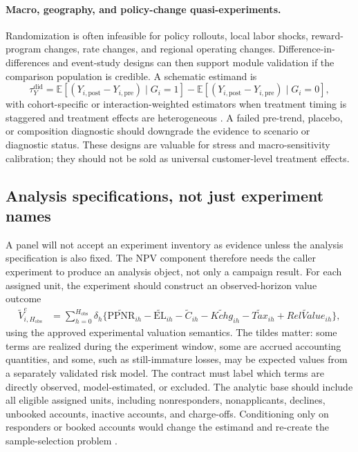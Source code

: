 \documentclass[11pt]{article}
\newcommand{\E}{\mathbb{E}}
\newcommand{\EL}{\mathrm{EL}}
\newcommand{\PPNR}{\mathrm{PPNR}}
\newcommand{\1}{\mathbf{1}}
\begin{document}
\paragraph{Macro, geography, and policy-change quasi-experiments.}
Randomization is often infeasible for policy rollouts, local labor shocks,
reward-program changes, rate changes, and regional operating changes.
Difference-in-differences and event-study designs can then support module
validation if the comparison population is credible. A schematic estimand is
\begin{equation}
  \tau^{\mathrm{did}}_Y
  =
  \E[(Y_{i,\mathrm{post}}-Y_{i,\mathrm{pre}})\mid G_i=1]
  -
  \E[(Y_{i,\mathrm{post}}-Y_{i,\mathrm{pre}})\mid G_i=0],
  \label{eq:did-estimand}
\end{equation}
with cohort-specific or interaction-weighted estimators when treatment timing
is staggered and treatment effects are heterogeneous
\citep{callaway2021did,sun2021eventstudy}. A failed pre-trend, placebo, or
composition diagnostic should downgrade the evidence to scenario or diagnostic
status. These designs are valuable for stress and macro-sensitivity
calibration; they should not be sold as universal customer-level treatment
effects.

\subsection{Analysis specifications, not just experiment names}

A panel will not accept an experiment inventory as evidence unless the analysis
specification is also fixed. The NPV component therefore needs the caller
experiment to produce an analysis object, not only a campaign result. For each
assigned unit, the experiment should construct an observed-horizon value
outcome
\begin{align}
  \widetilde{V}^{e}_{i,H_{\mathrm{obs}}}
  &=
  \sum_{h=0}^{H_{\mathrm{obs}}}\delta_h
  \{\widetilde{\PPNR}_{ih}
    -\widetilde{\EL}_{ih}
    -\widetilde{C}_{ih}
    -\widetilde{Kchg}_{ih}
    -\widetilde{Tax}_{ih}
    +\widetilde{RelValue}_{ih}\},
  \label{eq:experiment-constructed-value}
\end{align}
using the approved experimental valuation semantics. The tildes matter: some
terms are realized during the experiment window, some are accrued accounting
quantities, and some, such as still-immature losses, may be expected values
from a separately validated risk model. The contract must label which terms
are directly observed, model-estimated, or excluded. The analytic base should
include all eligible assigned units, including nonresponders, nonapplicants,
declines, unbooked accounts, inactive accounts, and charge-offs. Conditioning
only on responders or booked accounts would change the estimand and re-create
the sample-selection problem \citep{heckman1979selection}.
\end{document}
